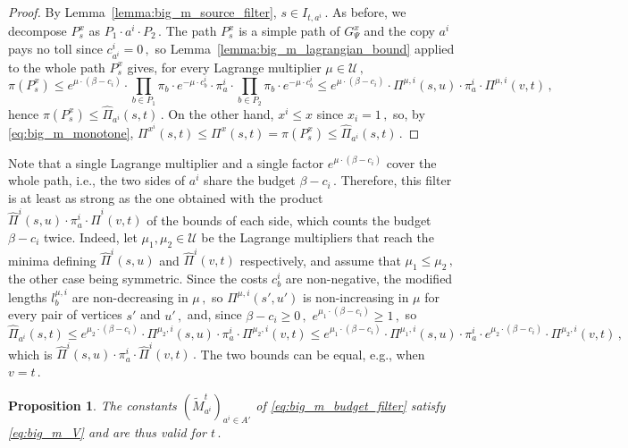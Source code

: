 \documentclass[11pt,a4paper]{report}
\newtheorem{proposition}[theorem]{Proposition}
\theoremstyle{definition}
\theoremstyle{remark}
\begin{document}
\begin{proof}
  By Lemma~\ref{lemma:big_m_source_filter}, $s \in I_{t,a^i}\,.$ As before, we decompose $P^x_s$ as $P_1 \cdot a^i \cdot P_2\,.$ The path $P^x_s$ is a simple path of $G^x_\Psi$ and the copy $a^i$ pays no toll since $c^i_{a^i} = 0\,,$ so Lemma~\ref{lemma:big_m_lagrangian_bound} applied to the whole path $P^x_s$ gives, for every Lagrange multiplier $\mu \in \mathcal{U}\,,$
  \begin{equation}
    \pi(P^x_s) \leq e^{\mu \cdot (\beta - c_i)} \cdot \prod_{b \in P_1} \pi_b \cdot e^{-\mu \cdot c^i_b} \cdot \pi^i_a \cdot \prod_{b \in P_2} \pi_b \cdot e^{-\mu \cdot c^i_b} \leq e^{\mu \cdot (\beta - c_i)} \cdot \Pi^{\mu,i}(s,u) \cdot \pi^i_a \cdot \Pi^{\mu,i}(v,t)\,,
  \end{equation}
  hence $\pi(P^x_s) \leq \widehat{\Pi}_{a^i}(s,t)\,.$ On the other hand, $x^i \leq x$ since $x_i = 1\,,$ so, by \eqref{eq:big_m_monotone}, $\Pi^{x^i}(s,t) \leq \Pi^x(s,t) = \pi(P^x_s) \leq \widehat{\Pi}_{a^i}(s,t)\,.$
\end{proof}

Note that a single Lagrange multiplier and a single factor $e^{\mu \cdot (\beta - c_i)}$ cover the whole path, i.e., the two sides of $a^i$ share the budget $\beta - c_i\,.$ Therefore, this filter is at least as strong as the one obtained with the product $\widehat{\Pi}^i(s,u) \cdot \pi^i_a \cdot \widehat{\Pi}^i(v,t)$ of the bounds of each side, which counts the budget $\beta - c_i$ twice. Indeed, let $\mu_1, \mu_2 \in \mathcal{U}$ be the Lagrange multipliers that reach the minima defining $\widehat{\Pi}^i(s,u)$ and $\widehat{\Pi}^i(v,t)$ respectively, and assume that $\mu_1 \leq \mu_2\,,$ the other case being symmetric. Since the costs $c^i_b$ are non-negative, the modified lengths $l^{\mu,i}_b$ are non-decreasing in $\mu\,,$ so $\Pi^{\mu,i}(s',u')$ is non-increasing in $\mu$ for every pair of vertices $s'$ and $u'\,,$ and, since $\beta - c_i \geq 0\,,$ $e^{\mu_1 \cdot (\beta - c_i)} \geq 1\,,$ so
\begin{equation}
  \widehat{\Pi}_{a^i}(s,t) \leq e^{\mu_2 \cdot (\beta - c_i)} \cdot \Pi^{\mu_2,i}(s,u) \cdot \pi^i_a \cdot \Pi^{\mu_2,i}(v,t) \leq e^{\mu_1 \cdot (\beta - c_i)} \cdot \Pi^{\mu_1,i}(s,u) \cdot \pi^i_a \cdot e^{\mu_2 \cdot (\beta - c_i)} \cdot \Pi^{\mu_2,i}(v,t)\,,
\end{equation}
which is $\widehat{\Pi}^i(s,u) \cdot \pi^i_a \cdot \widehat{\Pi}^i(v,t)\,.$ The two bounds can be equal, e.g., when $v = t\,.$

\begin{proposition}\label{prop:big_m_budget_filter}
  The constants $(\tilde{M}^t_{a^i})_{a^i \in A'}$ of \eqref{eq:big_m_budget_filter} satisfy \eqref{eq:big_m_V} and are thus valid for $t\,.$
\end{proposition}
\end{document}
